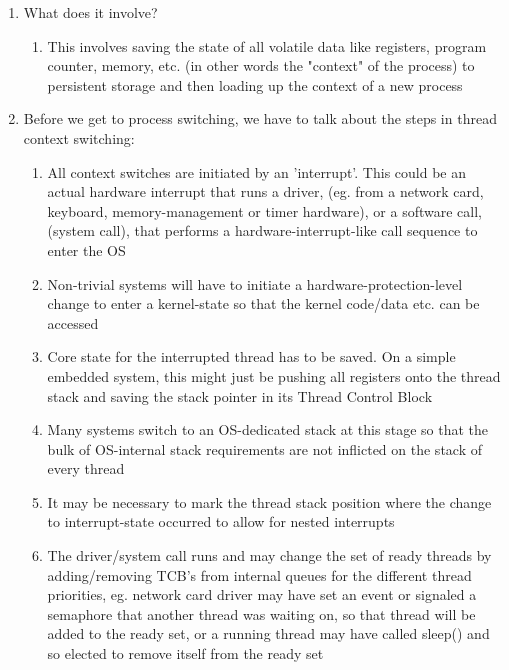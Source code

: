 \documentclass [12pt, executivepaper]{article}
\begin{document}
\begin{enumerate}
\begin{enumerate}
\begin{enumerate}
\end{enumerate}

\item What does it involve?

\begin{enumerate}

\item This involves saving the state of all volatile data like registers, program counter, memory, etc. (in other words the "context" of the process)  to persistent storage and then loading up the context of a new process

\end{enumerate}

\item Before we get to process switching, we have to talk about the steps in thread context switching:

\pagebreak

\vspace*{-40mm}

\begin{enumerate}

\item All context switches are initiated by an 'interrupt'. This could be an actual hardware interrupt that runs a driver, (eg. from a network card, keyboard, memory-management or timer hardware), or a software call, (system call), that performs a hardware-interrupt-like call sequence to enter the OS

\item Non-trivial systems will have to initiate a hardware-protection-level change to enter a kernel-state so that the kernel code/data etc. can be accessed

\item Core state for the interrupted thread has to be saved. On a simple embedded system, this might just be pushing all registers onto the thread stack and saving the stack pointer in its Thread Control Block

\item Many systems switch to an OS-dedicated stack at this stage so that the bulk of OS-internal stack requirements are not inflicted on the stack of every thread

\item It may be necessary to mark the thread stack position where the change to interrupt-state occurred to allow for nested interrupts

\item The driver/system call runs and may change the set of ready threads by adding/removing TCB's from internal queues for the different thread priorities, eg. network card driver may have set an event or signaled a semaphore that another thread was waiting on, so that thread will be added to the ready set, or a running thread may have called sleep() and so elected to remove itself from the ready set


\end{enumerate}
\end{enumerate}
\end{enumerate}
\end{document}
